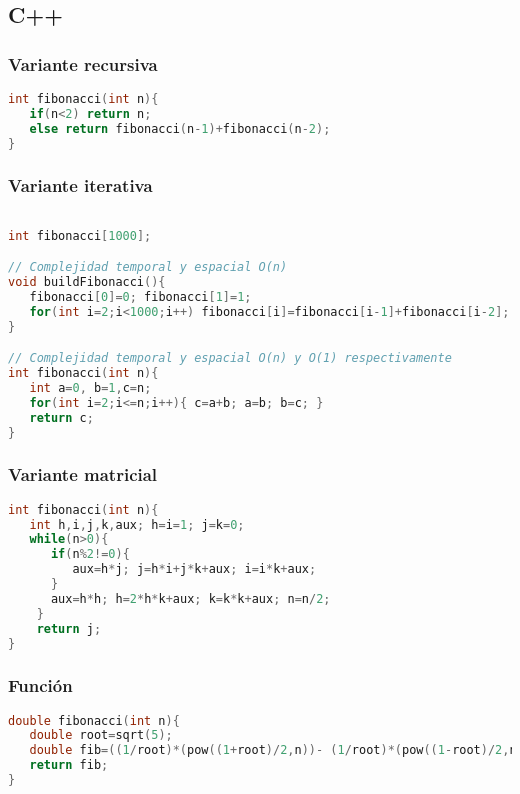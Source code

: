 \subsection{C++}

\subsubsection{Variante recursiva}

\begin{lstlisting}[language=C++]
int fibonacci(int n){
   if(n<2) return n;
   else return fibonacci(n-1)+fibonacci(n-2);	
}
\end{lstlisting}

\subsubsection{Variante iterativa}

\begin{lstlisting}[language=C++]
	
int fibonacci[1000];

// Complejidad temporal y espacial O(n)
void buildFibonacci(){ 
   fibonacci[0]=0; fibonacci[1]=1;
   for(int i=2;i<1000;i++) fibonacci[i]=fibonacci[i-1]+fibonacci[i-2];	
}

// Complejidad temporal y espacial O(n) y O(1) respectivamente
int fibonacci(int n){ 
   int a=0, b=1,c=n;
   for(int i=2;i<=n;i++){ c=a+b; a=b; b=c; }
   return c;
}
\end{lstlisting}

\subsubsection{Variante matricial}

\begin{lstlisting}[language=C++]
int fibonacci(int n){
   int h,i,j,k,aux; h=i=1; j=k=0;
   while(n>0){
      if(n%2!=0){
         aux=h*j; j=h*i+j*k+aux; i=i*k+aux; 
      }
      aux=h*h; h=2*h*k+aux; k=k*k+aux; n=n/2;
    }
    return j;
}
\end{lstlisting}

\subsubsection{Función}

\begin{lstlisting}[language=C++]
double fibonacci(int n){
   double root=sqrt(5);
   double fib=((1/root)*(pow((1+root)/2,n))- (1/root)*(pow((1-root)/2,n)));
   return fib;
}
\end{lstlisting}

